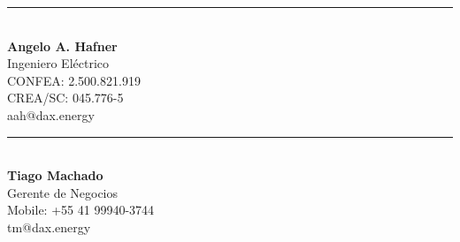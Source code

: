 \documentclass[a4paper]{article}
\begin{document}
\noindent %
\begin{minipage}[t]{0.5\textwidth} %
\centering %
\vspace{5cm} %
\rule{6cm}{0.4pt}\\ %
\textbf{Angelo A. Hafner}\\ %
Ingeniero Eléctrico\\ %
CONFEA: 2.500.821.919\\ %
CREA/SC: 045.776-5\\ %
aah@dax.energy %
\end{minipage}%
\hfill %
\begin{minipage}[t]{0.5\textwidth} %
\centering %
\vspace{5cm} %
\rule{6cm}{0.4pt}\\ %
\textbf{Tiago Machado}\\ %
Gerente de Negocios\\ %
Mobile: +55 41 99940-3744\\ %
tm@dax.energy %
\end{minipage}
\end{document}
